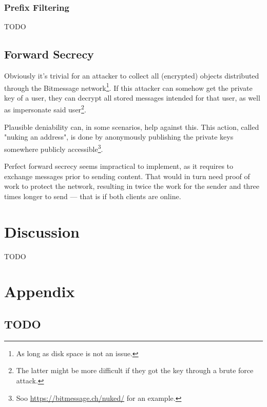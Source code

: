 \documentclass{bfh}
\begin{document}
  \subsubsection{Prefix Filtering}
  TODO

  \subsection{Forward Secrecy}

  Obviously it's trivial for an attacker to collect all (encrypted) objects distributed through the Bitmessage network\footnote{As long as disk space is not an issue.}. If this attacker can somehow get the private key of a user, they can decrypt all stored messages intended for that user, as well as impersonate said user\footnote{The latter might be more difficult if they got the key through a brute force attack.}.

  Plausible deniability can, in some scenarios, help against this. This action, called "nuking an address", is done by anonymously publishing the private keys somewhere publicly accessible\footnote{Soo \url{https://bitmessage.ch/nuked/} for an example.}.

  Perfect forward secrecy seems impractical to implement, as it requires to exchange messages prior to sending content. That would in turn need proof of work to protect the network, resulting in twice the work for the sender and three times longer to send --- that is if both clients are online.

  \section{Discussion}

  TODO


  
  

  \appendix
  \section*{Appendix}
  \renewcommand{\thesubsection}{\Alph{subsection}}

  \subsection{TODO}
\end{document}
